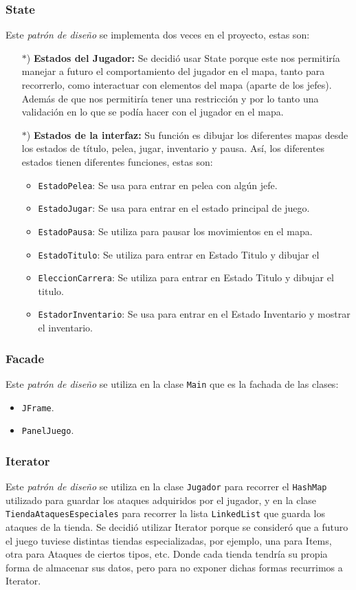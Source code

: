 \documentclass{article}
\newcommand{\code}[1]{\textcolor{white!25!black}{\texttt{#1}}}
\begin{document}
\subsubsection*{State}
Este \textit{patrón de diseño} se implementa dos veces en el proyecto, estas son:
\begin{itemize}
\item[$*$)] \textbf{Estados del Jugador:}
  Se decidió usar State porque este nos permitiría manejar a futuro el comportamiento del jugador en el mapa, tanto para recorrerlo, como interactuar con elementos del mapa (aparte de los jefes). Además de que nos permitiría tener una restricción y por lo tanto una validación en lo que se podía hacer con el jugador en el mapa.

\item[$*$)] \textbf{Estados de la interfaz:}
  Su función es dibujar los diferentes mapas desde los estados de título, pelea,
  jugar, inventario y pausa. Así, los diferentes estados tienen diferentes funciones,
  estas son:
  \begin{itemize}
  \item \code{EstadoPelea}: Se usa para entrar en pelea con algún jefe.
  \item \code{EstadoJugar}: Se usa para entrar en el estado principal de juego.
  \item \code{EstadoPausa}: Se utiliza para pausar los movimientos en el mapa.
  \item \code{EstadoTitulo}: Se utiliza para entrar en Estado Titulo y dibujar el 
  \item \code{EleccionCarrera}: Se utiliza para entrar en Estado Titulo y dibujar el titulo.
  \item \code{EstadorInventario}: Se usa para entrar en el Estado Inventario y mostrar el inventario. 
  \end{itemize}
\end{itemize}
\subsubsection*{Facade}
Este \textit{patrón de diseño} se utiliza en la clase \code{Main} que es la fachada
de las clases:
\begin{itemize}
\item \code{JFrame}.
\item \code{PanelJuego}.
\end{itemize}
\subsubsection*{Iterator}
Este \textit{patrón de diseño} se utiliza en la clase \code{Jugador} para
recorrer el \code{HashMap} utilizado para guardar los ataques adquiridos
por el jugador, y en la clase \code{TiendaAtaquesEspeciales} para recorrer
la lista \code{LinkedList} que guarda los ataques de la tienda. Se decidió utilizar Iterator porque se consideró que a futuro el juego tuviese distintas tiendas especializadas, por ejemplo, una para Items, otra para Ataques de ciertos tipos, etc. Donde cada tienda tendría su propia forma de almacenar sus datos, pero para no exponer dichas formas recurrimos a Iterator.
\end{document}
